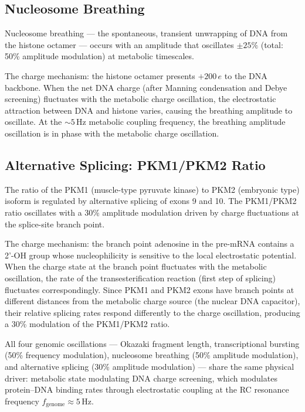 \subsection{Nucleosome Breathing}
\label{ssec:nuc_breathing}

Nucleosome breathing --- the spontaneous, transient unwrapping of DNA
from the histone octamer --- occurs with an amplitude that oscillates
$\pm 25\%$ (total: 50\% amplitude modulation) at metabolic timescales.

The charge mechanism: the histone octamer presents $+200\,e$ to the DNA
backbone. When the net DNA charge (after Manning condensation and Debye
screening) fluctuates with the metabolic charge oscillation, the
electrostatic attraction between DNA and histone varies, causing the
breathing amplitude to oscillate. At the $\sim 5\,\mathrm{Hz}$ metabolic
coupling frequency, the breathing amplitude oscillation is in phase with
the metabolic charge oscillation.

\subsection{Alternative Splicing: PKM1/PKM2 Ratio}
\label{ssec:alt_splicing}

The ratio of the PKM1 (muscle-type pyruvate kinase) to PKM2 (embryonic
type) isoform is regulated by alternative splicing of exons 9 and 10.
The PKM1/PKM2 ratio oscillates with a 30\% amplitude modulation driven
by charge fluctuations at the splice-site branch point.

The charge mechanism: the branch point adenosine in the pre-mRNA
contains a 2'-OH group whose nucleophilicity is sensitive to the local
electrostatic potential. When the charge state at the branch point
fluctuates with the metabolic oscillation, the rate of the
transesterification reaction (first step of splicing) fluctuates
correspondingly. Since PKM1 and PKM2 exons have branch points at
different distances from the metabolic charge source (the nuclear DNA
capacitor), their relative splicing rates respond differently to the
charge oscillation, producing a 30\% modulation of the PKM1/PKM2 ratio.

\begin{keyresult}
All four genomic oscillations --- Okazaki fragment length, transcriptional
bursting (50\% frequency modulation), nucleosome breathing (50\%
amplitude modulation), and alternative splicing (30\% amplitude
modulation) --- share the same physical driver: metabolic state
modulating DNA charge screening, which modulates protein--DNA binding
rates through electrostatic coupling at the RC resonance frequency
$f_{\mathrm{genome}} \approx 5\,\mathrm{Hz}$.
\end{keyresult}

